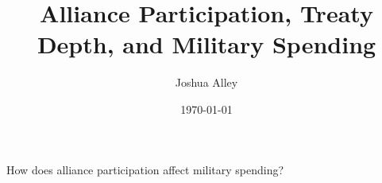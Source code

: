 \documentclass[12pt]{beamer}
\title{Alliance Participation, Treaty Depth, and Military Spending}
\date{\today}
\author{Joshua Alley}
\institute{Texas A\&M University}
\begin{document}
 \maketitle



 \begin{frame}[standout]

How does alliance participation affect military spending?  

 \end{frame}
 

 
\end{document}
